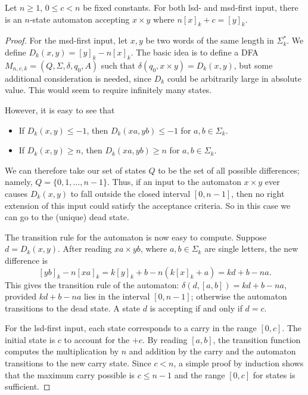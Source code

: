 \documentclass[12pt,reqno]{article}
\begin{document}
\begin{theorem} \label{theorem:n[x]+c=[y]-sc}
Let $n \geq 1$, $0 \leq c < n$ be fixed constants.
For both lsd- and msd-first input, there is an $n$-state automaton accepting $x \times y$ where $n[x]_k + c = [y]_k$.
\end{theorem}

\begin{proof}
    For the msd-first input, let $x, y $ be two words of the same length in $\Sigma_k^*$.
    We define $D_k (x,y ) = [y]_k - n [x]_k$.  The basic idea
    is to define a DFA $M_{n,c, k} = (Q,\Sigma, \delta, q_0, A)$
    such that $\delta(q_0, x \times y) = D_k(x,y)$, but some
    additional consideration is needed, since $D_k$ could
    be arbitrarily large in absolute value.  This would seem to
    require infinitely many states.
    
    However, it is easy to see that
    \begin{itemize}
    \item [(a)] If $D_k(x,y) \leq -1$, then $D_k(xa,yb) \leq -1$ for 
    $a, b \in \Sigma_k$.
    \item [(b)] If $D_k(x,y) \geq n$, then $D_k(xa,yb) \geq n$ for
    $a, b \in \Sigma_k$.
    \end{itemize}
    We can therefore take our set of states
    $Q$ to be the set of all possible
    differences; namely, $Q = \{0,1,\ldots, n-1 \}$.
    Thus, if an input to the automaton
    $x \times y$ ever causes $D_k(x,y)$ to fall outside the
    closed interval $[0,n-1]$, then no right extension of this
    input could satisfy the acceptance criteria.  So in this case we can go to the
    (unique) dead state.
    
    The transition rule for the automaton is now easy to
    compute.  Suppose $d = D_k (x,y)$.
    After reading $xa \times yb$, where $a, b \in
    \Sigma_k$ are single letters, the new difference is 
    $$[yb]_k- n [xa]_k = k[y]_k+b - n(k[x]_k + a) =
    kd+b-na.$$  
    This gives the transition rule of the automaton:
    $\delta(d, [a,b]) = kd+b-na$,
    provided $kd+b-na$ lies in the interval $[0,n-1]$; otherwise
    the automaton transitions to the dead state.    A state $d$ is
    accepting if and only if $d = c$.

    For the lsd-first input, each state corresponds to a carry in the range $[0, c]$. The initial state is $c$ to account for the $+c$. By reading $[a, b]$, the transition function computes the multiplication by $n$ and addition by the carry and the automaton transitions to the new carry state. Since $c < n$, a simple proof by induction shows that the maximum carry possible is $c \leq n-1$ and the range $[0, c]$ for states is sufficient.


\end{proof}
\end{document}
